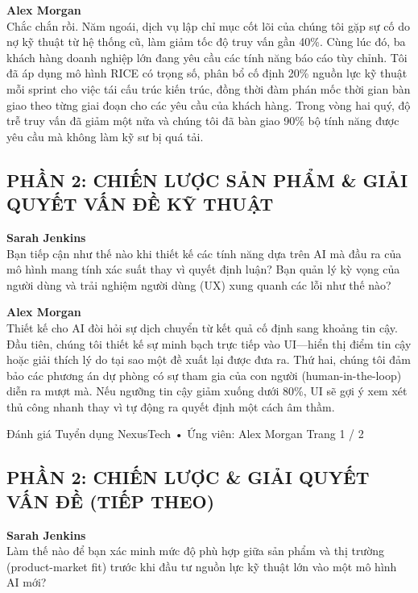 \vspace{0.5em}
\noindent\textbf{Alex Morgan} \\
Chắc chắn rồi. Năm ngoái, dịch vụ lập chỉ mục cốt lõi của chúng tôi gặp sự cố do nợ kỹ thuật từ hệ thống cũ, làm giảm tốc độ truy vấn gần 40\%. Cùng lúc đó, ba khách hàng doanh nghiệp lớn đang yêu cầu các tính năng báo cáo tùy chỉnh. Tôi đã áp dụng mô hình RICE có trọng số, phân bổ cố định 20\% nguồn lực kỹ thuật mỗi sprint cho việc tái cấu trúc kiến trúc, đồng thời đàm phán mốc thời gian bàn giao theo từng giai đoạn cho các yêu cầu của khách hàng. Trong vòng hai quý, độ trễ truy vấn đã giảm một nửa và chúng tôi đã bàn giao 90\% bộ tính năng được yêu cầu mà không làm kỹ sư bị quá tải.

\subsection*{PHẦN 2: CHIẾN LƯỢC SẢN PHẨM \& GIẢI QUYẾT VẤN ĐỀ KỸ THUẬT}

\noindent\textbf{Sarah Jenkins} \\
Bạn tiếp cận như thế nào khi thiết kế các tính năng dựa trên AI mà đầu ra của mô hình mang tính xác suất thay vì quyết định luận? Bạn quản lý kỳ vọng của người dùng và trải nghiệm người dùng (UX) xung quanh các lỗi như thế nào?

\vspace{0.5em}
\noindent\textbf{Alex Morgan} \\
Thiết kế cho AI đòi hỏi sự dịch chuyển từ kết quả cố định sang khoảng tin cậy. Đầu tiên, chúng tôi thiết kế sự minh bạch trực tiếp vào UI—hiển thị điểm tin cậy hoặc giải thích lý do tại sao một đề xuất lại được đưa ra. Thứ hai, chúng tôi đảm bảo các phương án dự phòng có sự tham gia của con người (human-in-the-loop) diễn ra mượt mà. Nếu ngưỡng tin cậy giảm xuống dưới 80\%, UI sẽ gợi ý xem xét thủ công nhanh thay vì tự động ra quyết định một cách âm thầm.

\vfill
\noindent\small{Đánh giá Tuyển dụng NexusTech • Ứng viên: Alex Morgan \hfill Trang 1 / 2}
\newpage

\subsection*{PHẦN 2: CHIẾN LƯỢC \& GIẢI QUYẾT VẤN ĐỀ (TIẾP THEO)}

\noindent\textbf{Sarah Jenkins} \\
Làm thế nào để bạn xác minh mức độ phù hợp giữa sản phẩm và thị trường (product-market fit) trước khi đầu tư nguồn lực kỹ thuật lớn vào một mô hình AI mới?

